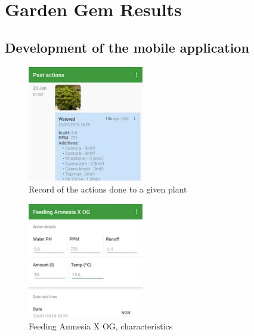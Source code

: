 \section{Garden Gem Results}
\subsection{Development of the mobile application}

\begin{figure}[th]
\centering
\includegraphics[width=0.45\textwidth]{./Figures/app1.png}
\decoRule
\caption[Record of the actions done to a given plant]{Record of the actions done to a given plant}
\label{fig:app1}
\end{figure}

\begin{figure}[th]
\centering
\includegraphics[width=0.45\textwidth]{./Figures/app2.png}
\decoRule
\caption[Feeding Amnesia X OG, characteristics]{Feeding Amnesia X OG, characteristics}
\label{fig:app2}
\end{figure}


